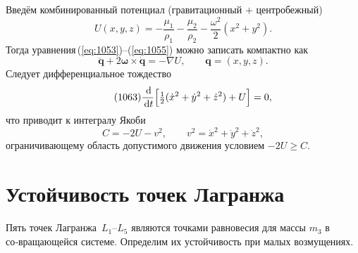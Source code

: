 \documentclass[12pt]{article}
\newcommand{\omegav}{\boldsymbol{\omega}}
\newcommand{\muone}{\mu_1}
\newcommand{\mutwo}{\mu_2}
\newcommand{\dd}{\,\mathrm d}
\begin{document}
Введём комбинированный потенциал (гравитационный $+$ центробежный)
\begin{equation}\tag{1059}\label{eq:U}
  U(x,y,z) = -\frac{\muone}{\rho_1}-\frac{\mutwo}{\rho_2}-\frac{\omega^{2}}{2}(x^{2}+y^{2}).
\end{equation}
Тогда уравнения\,(\ref{eq:1053})–(\ref{eq:1055}) можно записать компактно как
\begin{equation}\tag{1056--1058}
  \ddot {\mathbf q} + 2\omegav\times\dot{\mathbf q} = -\nabla U,\qquad \mathbf q=(x,y,z).
\end{equation}
Следует дифференциальное тождество
\begin{equation}\tag{1063}\label{eq:jacobi}
  \frac{\dd}{\dd t}\Bigl[\tfrac12(\dot x^{2}+\dot y^{2}+\dot z^{2})+U\Bigr]=0,
\end{equation}
что приводит к интегралу Якоби
\begin{equation}\tag{1064}
  C = -2U-v^{2},\qquad v^{2}=\dot x^{2}+\dot y^{2}+\dot z^{2},
\end{equation}
ограничивающему область допустимого движения условием $-2U\ge C$. \par
\bigskip

\section{Устойчивость точек Лагранжа}\label{sec:stability}

Пять точек Лагранжа~$L_1$–$L_5$ являются точками равновесия для массы $m_3$ в со‑вращающейся системе. Определим их устойчивость при малых возмущениях.
\end{document}
